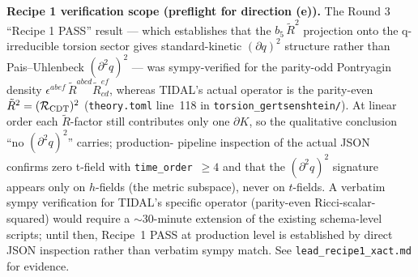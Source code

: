 \noindent
\textbf{Recipe 1 verification scope (preflight for direction (e)).}
The Round 3 ``Recipe 1 PASS'' result --- which establishes that the
$b_5\,\tilde{R}^2$ projection onto the q-irreducible torsion sector
gives standard-kinetic $(\partial q)^2$ structure rather than
Pais--Uhlenbeck $(\partial^2 q)^2$ --- was sympy-verified for the
parity-odd Pontryagin density $\epsilon^{abef}\,\tilde{R}^{abcd}
\tilde{R}_{cd}^{ef}$, whereas TIDAL's actual operator is the parity-even
$\tilde{R}^2 = (\mathcal{R}_{\rm CDT})^2$ (\texttt{theory.toml} line~118
in \texttt{torsion\_gertsenshtein/}).  At linear order each
$\tilde{R}$-factor still contributes only one $\partial K$, so the
qualitative conclusion ``no $(\partial^2 q)^2$'' carries; production-
pipeline inspection of the actual JSON confirms zero t-field with
\texttt{time\_order}~$\geq 4$ and that the $(\partial^2 q)^2$ signature
appears only on $h$-fields (the metric subspace), never on $t$-fields.
A verbatim sympy verification for TIDAL's specific operator (parity-even
Ricci-scalar-squared) would require a $\sim$30-minute extension of the
existing schema-level scripts; until then, Recipe~1 PASS at production
level is established by direct JSON inspection rather than verbatim
sympy match.  See \texttt{lead\_recipe1\_xact.md} for evidence.

